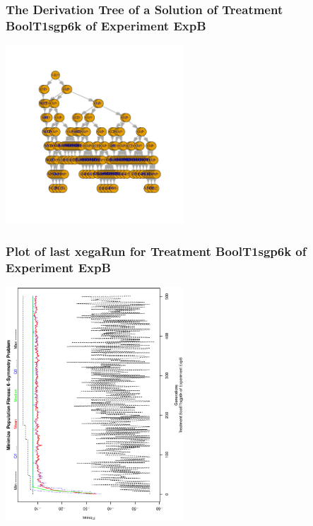 \documentclass[18pt,c]{beamer}
\begin{document}
 \begin{frame}
 \frametitle{ The Derivation Tree of a Solution of Treatment BoolT1sgp6k of Experiment ExpB }
 \begin{center}
\includegraphics[width=0.5\textwidth, angle=0]
{ExpBDerivationTreeFigure009.pdf}
 \end{center}
 \label{report/ExpBDerivationTreeFigure009.pdf}  
 \end{frame}

 \begin{frame}
 \frametitle{ Plot of last xegaRun for Treatment BoolT1sgp6k of Experiment ExpB }
 \begin{center}
\includegraphics[width=0.5\textwidth, angle=-90]
{ExpBPlotPopStatsFigure009.eps}
 \end{center}
 \label{report/ExpBPlotPopStatsFigure009.eps}  
 \end{frame}
\end{document}
